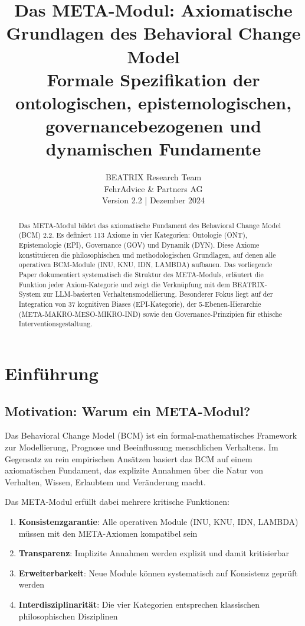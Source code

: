 \documentclass[11pt,a4paper]{article}
\title{%
    \Large \textbf{Das META-Modul: Axiomatische Grundlagen des Behavioral Change Model} \\[0.5em]
    \large Formale Spezifikation der ontologischen, epistemologischen, governancebezogenen und dynamischen Fundamente
}
\author{%
    BEATRIX Research Team \\
    FehrAdvice \& Partners AG \\[0.5em]
    \small Version 2.2 | Dezember 2024
}
\date{}
\theoremstyle{definition}
\theoremstyle{plain}
\newcommand{\BCM}{\textsc{BCM}}
\newcommand{\META}{\textsc{META}}
\newcommand{\BEATRIX}{\textsc{BEATRIX}}
\begin{document}
\maketitle

\begin{abstract}
Das \META-Modul bildet das axiomatische Fundament des Behavioral Change Model (\BCM) 2.2. Es definiert 113 Axiome in vier Kategorien: Ontologie (ONT), Epistemologie (EPI), Governance (GOV) und Dynamik (DYN). Diese Axiome konstituieren die philosophischen und methodologischen Grundlagen, auf denen alle operativen BCM-Module (INU, KNU, IDN, LAMBDA) aufbauen. Das vorliegende Paper dokumentiert systematisch die Struktur des \META-Moduls, erläutert die Funktion jeder Axiom-Kategorie und zeigt die Verknüpfung mit dem \BEATRIX-System zur LLM-basierten Verhaltensmodellierung. Besonderer Fokus liegt auf der Integration von 37 kognitiven Biases (EPI-Kategorie), der 5-Ebenen-Hierarchie (META-MAKRO-MESO-MIKRO-IND) sowie den Governance-Prinzipien für ethische Interventionsgestaltung.
\end{abstract}

\tableofcontents
\newpage

\section{Einführung}

\subsection{Motivation: Warum ein META-Modul?}

Das Behavioral Change Model (\BCM) ist ein formal-mathematisches Framework zur Modellierung, Prognose und Beeinflussung menschlichen Verhaltens. Im Gegensatz zu rein empirischen Ansätzen basiert das \BCM{} auf einem axiomatischen Fundament, das explizite Annahmen über die Natur von Verhalten, Wissen, Erlaubtem und Veränderung macht.

Das \META-Modul erfüllt dabei mehrere kritische Funktionen:

\begin{enumerate}[label=(\roman*)]
    \item \textbf{Konsistenzgarantie}: Alle operativen Module (INU, KNU, IDN, LAMBDA) müssen mit den \META-Axiomen kompatibel sein
    \item \textbf{Transparenz}: Implizite Annahmen werden explizit und damit kritisierbar
    \item \textbf{Erweiterbarkeit}: Neue Module können systematisch auf Konsistenz geprüft werden
    \item \textbf{Interdisziplinarität}: Die vier Kategorien entsprechen klassischen philosophischen Disziplinen
\end{enumerate}
\end{document}
